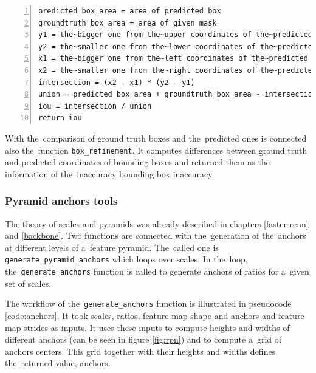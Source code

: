 {\scriptsize
\begin{lstlisting}[style=python, caption={compute\_iou}, captionpos=b, 
label=code:iou, deletekeywords={from, and},
backgroundcolor = \color{light-gray}, numbers=left, breaklines=true]
predicted_box_area = area of predicted box
groundtruth_box_area = area of given mask
y1 = the~bigger one from the~upper coordinates of the~predicted and ground truth bboxes
y2 = the~smaller one from the~lower coordinates of the~predicted and ground truth bboxes
x1 = the~bigger one from the~left coordinates of the~predicted and ground truth bboxes
x2 = the~smaller one from the~right coordinates of the~predicted and ground truth bboxes
intersection = (x2 - x1) * (y2 - y1)
union = predicted_box_area + groundtruth_box_area - intersection
iou = intersection / union
return iou
\end{lstlisting}}

With the~comparison of ground truth boxes and the~predicted ones is connected 
also the~function \verb|box_refinement|. It computes differences between ground 
truth and predicted coordinates of bounding boxes and returned them as the~
information of the~inaccuracy bounding box inaccuracy.


\subsubsection{Pyramid anchors tools}
\label{anchors-func}

The theory of scales and pyramids was already described in chapters 
\ref{faster-rcnn} and \ref{backbone}. Two functions are connected with
the~generation of the~anchors at different levels of a~feature pyramid. The~called 
one is \verb|generate_pyramid_anchors| which loops over scales. In the~loop,
the~\verb|generate_anchors| function is called to generate anchors of ratios for
a~given set of scales. 

The workflow of the~\verb|generate_anchors| function is illustrated in 
pseudocode \ref{code:anchors}. It took scales, ratios, feature map shape and 
anchors and feature map strides as inputs. It uses these inputs to compute 
heights and widths of different anchors (can be seen in figure \ref{fig:rpn}) 
and to compute a~grid of anchors centers. This grid together with their heights 
and widths defines the~returned value, anchors.

